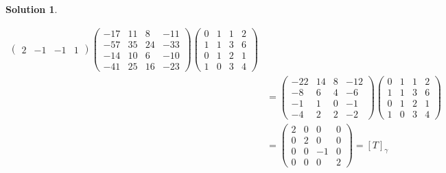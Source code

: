 \documentclass[10pt]{article}
\theoremstyle{definition}
\newtheorem{soln}{Solution}
\begin{document}
\begin{soln}
\begin{enumerate}
\begin{align*}
\begin{pmatrix}
              2   & -1 & -1 & 1
            \end{pmatrix}
            \begin{pmatrix}
              -17 & 11 & 8  & -11 \\
              -57 & 35 & 24 & -33 \\
              -14 & 10 & 6  & -10 \\
              -41 & 25 & 16 & -23
            \end{pmatrix}
            \begin{pmatrix}
              0 & 1 & 1 & 2 \\
              1 & 1 & 3 & 6 \\
              0 & 1 & 2 & 1 \\
              1 & 0 & 3 & 4
            \end{pmatrix}                                                                                    \\
             & =
            \begin{pmatrix}
              -22 & 14 & 8 & -12 \\
              -8  & 6  & 4 & -6  \\
              -1  & 1  & 0 & -1  \\
              -4  & 2  & 2 & -2
            \end{pmatrix}
            \begin{pmatrix}
              0 & 1 & 1 & 2 \\
              1 & 1 & 3 & 6 \\
              0 & 1 & 2 & 1 \\
              1 & 0 & 3 & 4
            \end{pmatrix}                                                                                    \\
             & =
            \begin{pmatrix}
              2 & 0 & 0  & 0 \\
              0 & 2 & 0  & 0 \\
              0 & 0 & -1 & 0 \\
              0 & 0 & 0  & 2
            \end{pmatrix}=\left[T\right]_\gamma                                                               \\
          \end{align*}
  \end{enumerate}
\end{soln}
\newpage
\end{document}

